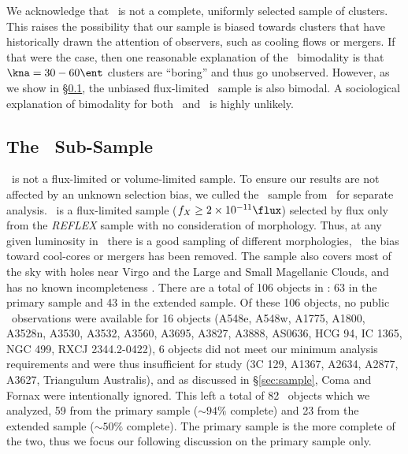 \documentclass[apj]{emulateapj}
\begin{document}
We acknowledge that \accept\ is not a complete, uniformly selected
sample of clusters. This raises the possibility that our sample is
biased towards clusters that have historically drawn the attention of
observers, such as cooling flows or mergers. If that were the case,
then one reasonable explanation of the \kna\ bimodality is that $\kna
= 30-60 \ent$ clusters are ``boring'' and thus go unobserved. However,
as we show in \S\ref{sec:hifl}, the unbiased flux-limited
\hifl\ sample is also bimodal. A sociological explanation of
bimodality for both \accept\ and \hifl\ is highly unlikely.


\subsection{The \hifl\ Sub-Sample}
\label{sec:hifl}

\accept\ is not a flux-limited or volume-limited sample. To ensure our
results are not affected by an unknown selection bias, we culled the
\hifl\ sample from \accept\ for separate analysis. \hifl\ is a
flux-limited sample ($f_X \ge 2 \times 10^{-11} \flux$) selected by
flux only from the {\it{REFLEX}} sample \citep{reflex} with no
consideration of morphology. Thus, at any given luminosity in
\hifl\ there is a good sampling of different morphologies, \ie\ the
bias toward cool-cores or mergers has been removed. The sample also
covers most of the sky with holes near Virgo and the Large and Small
Magellanic Clouds, and has no known incompleteness
\citep{2007A&A...466..805C}. There are a total of 106 objects in
\hifl: 63 in the primary sample and 43 in the extended sample. Of
these 106 objects, no public \chandra\ observations were available for
16 objects (A548e, A548w, A1775, A1800, A3528n, A3530, A3532, A3560,
A3695, A3827, A3888, AS0636, HCG 94, IC 1365, NGC 499, RXCJ
2344.2-0422), 6 objects did not meet our minimum analysis requirements
and were thus insufficient for study (3C 129, A1367, A2634, A2877,
A3627, Triangulum Australis), and as discussed in \S\ref{sec:sample},
Coma and Fornax were intentionally ignored. This left a total of 82
\hifl\ objects which we analyzed, 59 from the primary sample ($\sim
94\%$ complete) and 23 from the extended sample ($\sim 50\%$
complete). The primary sample is the more complete of the two, thus we
focus our following discussion on the primary sample only.
\end{document}
